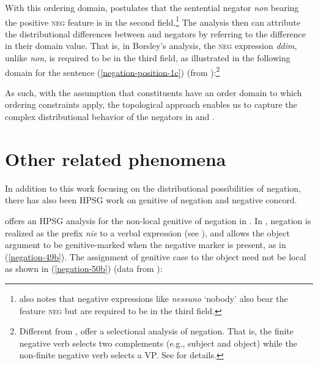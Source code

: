 \documentclass[output=paper
 	        ,biblatex
                ,babelshorthands
                ,newtxmath
                ,draftmode
                ,colorlinks, citecolor=brown
]{langscibook}
\begin{document}
\begin{exe}
\begin{xlist}
\begin{exe}
\begin{xlist}
\ea
{}
\z
%
With this ordering domain, \citet{Borsley:06} postulates
that the  sentential negator \emph{non} bearing the positive \textsc{neg} feature is in the second field.\footnote{
\citet{Borsley:06} also notes that  negative expressions like \emph{nessuno} `nobody' also bear the feature \textsc{neg}
but are required to be in the third field.}
The analysis then can attribute the distributional differences between  and  negators
by referring to the difference in their domain value. That is,
in Borsley's analysis, the  \textsc{neg} expression \emph{ddim}, unlike  \emph{non},
is required to be in the third field, as illustrated in the following domain for the sentence (\ref{negation-position-1c}) (from
\citealt[]{Borsley:06}):\footnote{Different from \citet{Borsley:06}, \citet{BJ:00} offer  a selectional analysis of  negation.
That is, the finite negative verb selects
two complements (e.g., subject and object) while
the non-finite negative verb selects a VP. See \citet{BJ:00} for details.}

\ea
{}
\z
As such,  with the assumption that constituents have an order domain to which ordering
constraints apply, the topological approach enables us to capture the complex distributional
behavior of the negators in  and .

\section{Other related phenomena}
\label{negation:sec-other-phenomena}

In addition to this work focusing on the distributional possibilities of negation, there has also
been HPSG work on genitive of negation and negative concord.

\citet{Prz:00} offers an HPSG analysis for the non-local genitive of negation in .  In
, negation is realized as the prefix \emph{nie} to a verbal expression (see
\citealt{PK:99, Prz:00, Prz:01}), and  allows the object argument to be genitive-marked
when the negative marker is present, as in (\ref{negation-49b}).  The assignment of genitive case
to the object need not be local as shown in (\ref{negation-50b}) (data from \citealt[]{Prz:00}):


\end{xlist}
\end{exe}
\end{xlist}
\end{exe}
\end{document}
